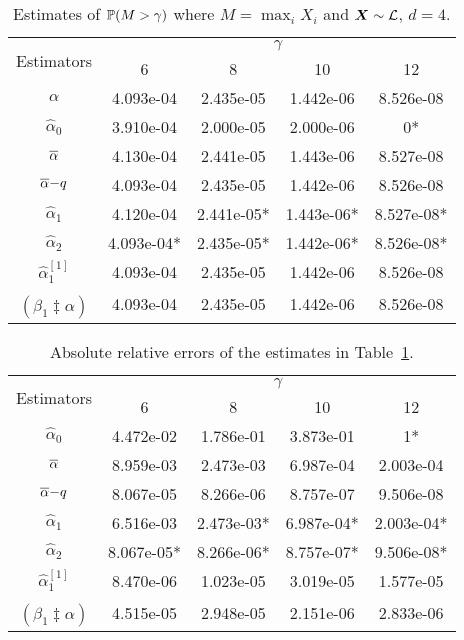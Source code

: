 \begin{table}[H]
\centering
\begin{tabular}{ccccc}
\toprule
\multirow{2}{*}{Estimators} & \multicolumn{4}{c}{$\gamma$} \\
                            & 6    & 8    & 10    & 12    \\ 
\midrule
$\alpha$ & 4.093e-04 & 2.435e-05 & 1.442e-06 & 8.526e-08 \\
\rowcolor{Gray} $\hat{\alpha}_0$ & 3.910e-04 & 2.000e-05 & 2.000e-06 & 0* \\
$\overline{\alpha}$ & 4.130e-04 & 2.441e-05 & 1.443e-06 & 8.527e-08 \\
\rowcolor{Gray} $\overline{\alpha}{-}q$ & 4.093e-04 & 2.435e-05 & 1.442e-06 & 8.526e-08 \\
$\hat{\alpha}_1$ & 4.120e-04 & 2.441e-05* & 1.443e-06* & 8.527e-08* \\
\rowcolor{Gray} $\hat{\alpha}_2$ & 4.093e-04* & 2.435e-05* & 1.442e-06* & 8.526e-08* \\
$\hat{\alpha}_1^{[1]}$ & 4.093e-04 & 2.435e-05 & 1.442e-06 & 8.526e-08 \\
\rowcolor{Gray} $\widehat{(\beta_1 \ddagger \alpha)}$ & 4.093e-04 & 2.435e-05 & 1.442e-06 & 8.526e-08 \\
\bottomrule
\end{tabular}
\caption{Estimates of $\operatorname{{\mathbb P}}(M>\gamma)$ where $M=\max_i X_i$ and $\bm{X} \sim \mathcal{L}$, $d=4$.}
\label{table:laplace_ests}
\end{table}


\begin{table}[H]
\centering
\begin{tabular}{ccccc}
\toprule
\multirow{2}{*}{Estimators} & \multicolumn{4}{c}{$\gamma$} \\
                            & 6    & 8    & 10    & 12    \\ 
\midrule
$\hat{\alpha}_0$ & 4.472e-02 & 1.786e-01 & 3.873e-01 & 1* \\
\rowcolor{Gray} $\overline{\alpha}$ & 8.959e-03 & 2.473e-03 & 6.987e-04 & 2.003e-04 \\
$\overline{\alpha}{-}q$ & 8.067e-05 & 8.266e-06 & 8.757e-07 & 9.506e-08 \\
\rowcolor{Gray} $\hat{\alpha}_1$ & 6.516e-03 & 2.473e-03* & 6.987e-04* & 2.003e-04* \\
$\hat{\alpha}_2$ & 8.067e-05* & 8.266e-06* & 8.757e-07* & 9.506e-08* \\
\rowcolor{Gray} $\hat{\alpha}_1^{[1]}$ & 8.470e-06 & 1.023e-05 & 3.019e-05 & 1.577e-05 \\
$\widehat{(\beta_1 \ddagger \alpha)}$ & 4.515e-05 & 2.948e-05 & 2.151e-06 & 2.833e-06 \\
\bottomrule
\end{tabular}
\caption{Absolute relative errors of the estimates in Table~\ref{table:laplace_ests}.}
\end{table}



